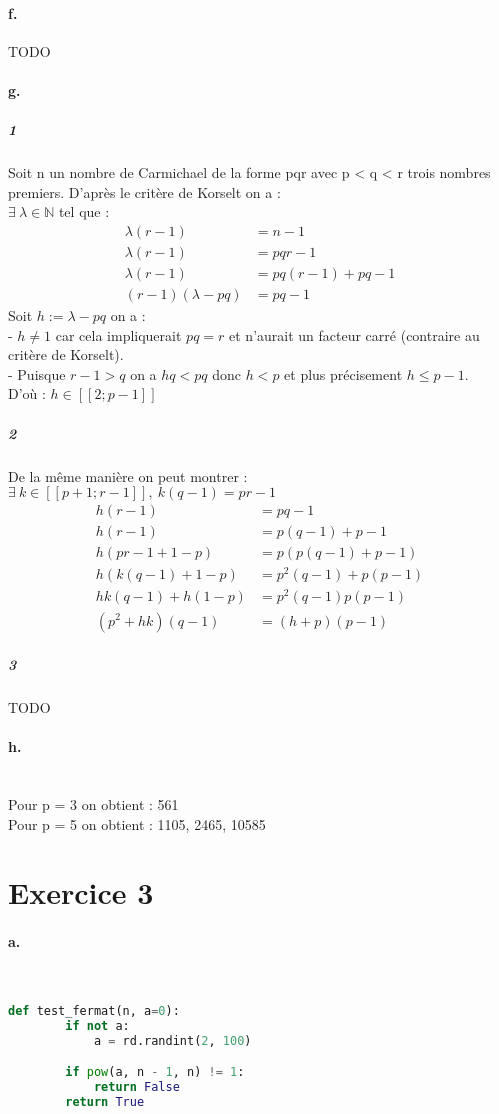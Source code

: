 \documentclass[french]{article}
\begin{document}
\paragraph{f.} TODO
\paragraph{g.}\subparagraph{1} Soit n un nombre de Carmichael de la forme pqr avec p < q < r trois nombres premiers. D'après le critère de Korselt on a :\\
$\exists \:\lambda \in \mathbb{N}$ tel que :
\begin{align*}
    \lambda(r-1)&=n-1\\
    \lambda(r-1)&=pqr-1\\
    \lambda(r-1)&=pq(r-1)+pq-1\\
    (r-1)(\lambda-pq)&=pq-1
\end{align*}
Soit $h := \lambda - pq$ on a :\\
 - $h \ne 1$ car cela impliquerait $pq=r$ et n'aurait un facteur carré (contraire au critère de Korselt).\\
 - Puisque $r-1>q$ on a $hq<pq$ donc $h<p$ et plus précisement $h \leq p-1$.\\
D'où : $h \in [\![2; p-1]\!]$
\subparagraph{2} De la même manière on peut montrer : $\exists \:k \in [\![p+1; r-1]\!], \: k(q-1)=pr-1$
\begin{align*}
    h(r-1)&=pq-1\\h(r-1)&=p(q-1)+p-1\\h(pr -1 +1 -p)&=p(p(q-1)+p-1)\\
    h(k(q-1) +1 -p)&=p^2(q-1)+p(p-1)\\
    hk(q-1)+h(1-p)&=p^2(q-1)p(p-1)\\
    (p^2+hk)(q-1)&=(h+p)(p-1)
\end{align*}
\subparagraph{3} TODO
\paragraph{h.}  \*\\ Pour p = 3 on obtient : 561 \\ Pour p = 5 on obtient : 1105, 2465, 10585
\section*{Exercice 3}
\paragraph{a.} \
\begin{lstlisting}[language=Python, belowskip=-1 \baselineskip]
    def test_fermat(n, a=0):
        if not a:
            a = rd.randint(2, 100)

        if pow(a, n - 1, n) != 1:
            return False
        return True
\end{lstlisting}
\end{document}
